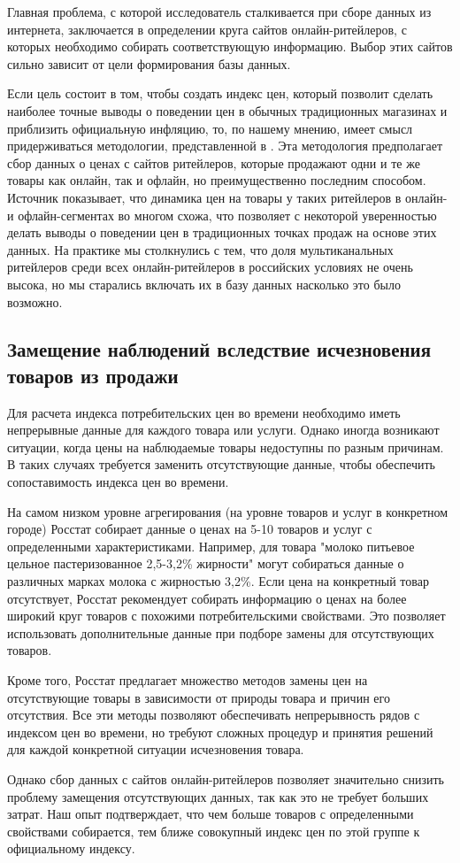 Главная проблема, с которой исследователь сталкивается при сборе данных из интернета, заключается в определении круга сайтов онлайн-ритейлеров, с которых необходимо собирать соответствующую информацию. Выбор этих сайтов сильно зависит от цели формирования базы данных. 

Если цель состоит в том, чтобы создать индекс цен, который позволит сделать наиболее точные выводы о поведении цен в обычных традиционных магазинах и приблизить официальную инфляцию, то, по нашему мнению, имеет смысл придерживаться методологии, представленной в \cite{cavallo2016billion}. Эта методология предполагает сбор данных о ценах с сайтов ритейлеров, которые продажают одни и те же товары как онлайн, так и офлайн, но преимущественно последним способом. Источник \cite{cavallo2016online} показывает, что динамика цен на товары у таких ритейлеров в онлайн- и офлайн-сегментах во многом схожа, что позволяет с некоторой уверенностью делать выводы о поведении цен в традиционных точках продаж на основе этих данных. На практике мы столкнулись с тем, что доля мультиканальных ритейлеров среди всех онлайн-ритейлеров в российских условиях не очень высока, но мы старались включать их в базу данных насколько это было возможно.

\subsection{Замещение наблюдений вследствие исчезновения товаров из продажи }\label{subsec:ch2/sec2/sub2}

Для расчета индекса потребительских цен во времени необходимо иметь непрерывные данные для каждого товара или услуги. Однако иногда возникают ситуации, когда цены на наблюдаемые товары недоступны по разным причинам. В таких случаях требуется заменить отсутствующие данные, чтобы обеспечить сопоставимость индекса цен во времени.

На самом низком уровне агрегирования (на уровне товаров и услуг в конкретном городе) Росстат собирает данные о ценах на 5-10 товаров и услуг с определенными характеристиками. Например, для товара "молоко питьевое цельное пастеризованное 2,5-3,2\% жирности" могут собираться данные о различных марках молока с жирностью 3,2\%. Если цена на конкретный товар отсутствует, Росстат рекомендует собирать информацию о ценах на более широкий круг товаров с похожими потребительскими свойствами. Это позволяет использовать дополнительные данные при подборе замены для отсутствующих товаров.

Кроме того, Росстат предлагает множество методов замены цен на отсутствующие товары в зависимости от природы товара и причин его отсутствия. Все эти методы позволяют обеспечивать непрерывность рядов с индексом цен во времени, но требуют сложных процедур и принятия решений для каждой конкретной ситуации исчезновения товара.

Однако сбор данных с сайтов онлайн-ритейлеров позволяет значительно снизить проблему замещения отсутствующих данных, так как это не требует больших затрат. Наш опыт подтверждает, что чем больше товаров с определенными свойствами собирается, тем ближе совокупный индекс цен по этой группе к официальному индексу.
